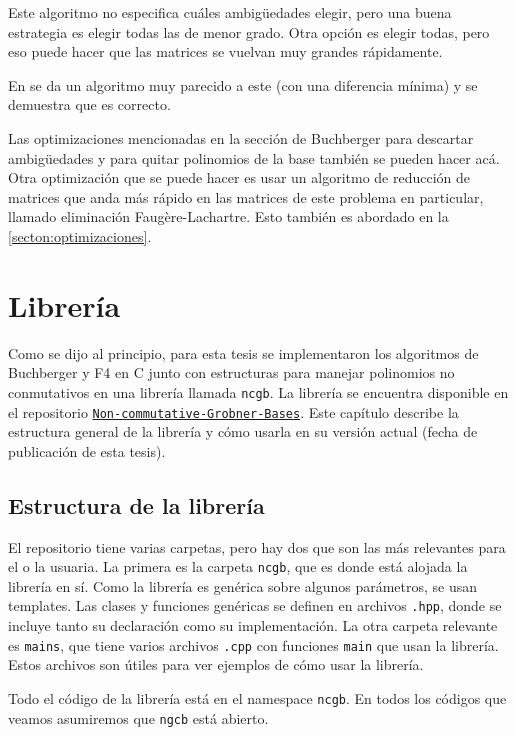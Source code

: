 \documentclass[12pt]{report}
\theoremstyle{customstyle}
\theoremstyle{factstyle}
\newcommand\cpp{C\nolinebreak[4]\hspace{-.05em}\raisebox{.4ex}{\relsize{-3}{\textbf{++}}}\xspace}
\begin{document}
Este algoritmo no especifica cuáles ambigüedades elegir, pero una buena estrategia es elegir todas las de menor grado. Otra opción es elegir todas, pero eso puede hacer que las matrices se vuelvan muy grandes rápidamente.

En \cite{thesis:Hof20} se da un algoritmo muy parecido a este (con una diferencia mínima) y se demuestra que es correcto.

Las optimizaciones mencionadas en la sección de Buchberger para descartar ambigüedades y para quitar polinomios de la base también se pueden hacer acá. Otra optimización que se puede hacer es usar un algoritmo de reducción de matrices que anda más rápido en las matrices de este problema en particular, llamado eliminación Faugère-Lachartre. Esto también es abordado en la \cref{secton:optimizaciones}.

\chapter{Librería}

Como se dijo al principio, para esta tesis se implementaron los algoritmos de Buchberger y F4 en \cpp junto con estructuras para manejar polinomios no conmutativos en una librería llamada \texttt{ncgb}. La librería  se encuentra disponible en el repositorio \href{https://github.com/IvanRenison/Non-commutative-Grobner-Bases}{\texttt{Non-commutative-Grobner-Bases}}. Este capítulo describe la estructura general de la librería y cómo usarla en su versión actual (fecha de publicación de esta tesis).

\section{Estructura de la librería}

El repositorio tiene varias carpetas, pero hay dos que son las más relevantes para el o la usuaria. La primera es la carpeta \texttt{ncgb}, que es donde está alojada la librería en sí. Como la librería es genérica sobre algunos parámetros, se usan templates. Las clases y funciones genéricas se definen en archivos \texttt{.hpp}, donde se incluye tanto su declaración como su implementación. La otra carpeta relevante es \texttt{mains}, que tiene varios archivos \texttt{.cpp} con funciones \texttt{main} que usan la librería. Estos archivos son útiles para ver ejemplos de cómo usar la librería.

Todo el código de la librería está en el namespace \texttt{ncgb}. En todos los códigos que veamos asumiremos que \texttt{ngcb} está abierto.
\end{document}
